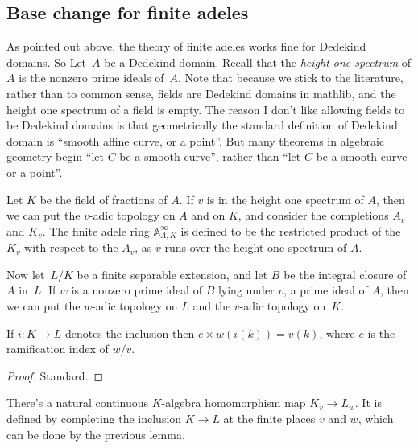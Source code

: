\subsection{Base change for finite adeles}

As pointed out above, the theory of finite adeles works fine for Dedekind domains.
So Let~$A$ be a Dedekind domain. Recall that the \emph{height one spectrum} of $A$ is
the nonzero prime ideals of~$A$. Note that because we stick to the literature,
rather than to common sense, fields are Dedekind domains in mathlib, and the
height one spectrum of a field is empty. The reason I don't like allowing fields
to be Dedekind domains is that geometrically the standard definition of Dedekind
domain is ``smooth affine curve, or a point''. But many theorems in algebraic geometry
begin ``let $C$ be a smooth curve'', rather than ``let $C$ be a smooth curve or a point''.

Let $K$ be the field of fractions of $A$. If $v$ is in the height one spectrum of $A$,
then we can put the $v$-adic topology on $A$ and on $K$, and consider the completions
$A_v$ and $K_v$. The finite adele ring $\mathbb{A}_{A,K}^\infty$ is defined to be
the restricted product of the $K_v$ with respect to the $A_v$, as $v$ runs over
the height one spectrum of $A$.

Now let~$L/K$ be a finite separable extension, and let $B$ be the integral closure of~$A$ in~$L$.
If $w$ is a nonzero prime ideal of $B$ lying under $v$, a prime ideal of $A$, then we can put the
$w$-adic topology on $L$ and the $v$-adic topology on~$K$.

\begin{lemma} If $i:K\to L$ denotes the inclusion then $e\times w(i(k))=v(k)$, where
  $e$ is the ramification index of $w/v$.
  \label{IsDedekindDomain.HeightOneSpectrum.valuation_comap}
  \leanok
\end{lemma}
\begin{proof}
  \leanok
  Standard.
\end{proof}

\begin{definition}
  \label{IsDedekindDomain.HeightOneSpectrum.adicCompletionComapAlgHom}
  \leanok
  There's a natural continuous $K$-algebra homomorphism map $K_v\to L_w$. It is defined by completing
  the inclusion $K\to L$ at the finite places $v$ and $w$, which can be done
  by the previous lemma.
\end{definition}

